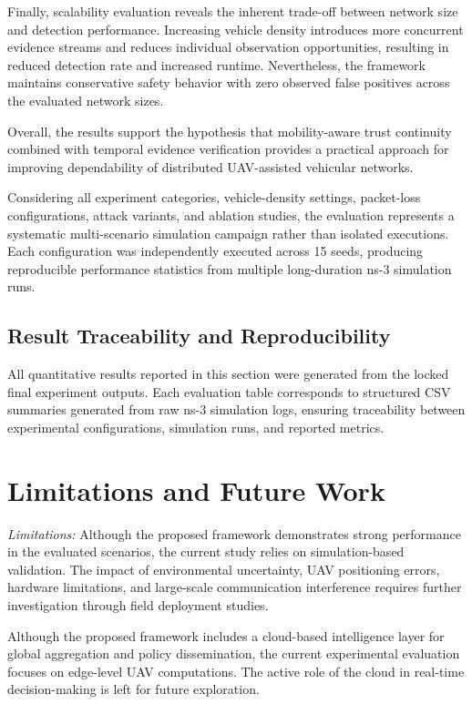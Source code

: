 \documentclass[journal]{IEEEtran}
\begin{document}
Finally, scalability evaluation reveals the inherent trade-off between
network size and detection performance. Increasing vehicle density introduces
more concurrent evidence streams and reduces individual observation
opportunities, resulting in reduced detection rate and increased runtime.
Nevertheless, the framework maintains conservative safety behavior with zero
observed false positives across the evaluated network sizes.

Overall, the results support the hypothesis that mobility-aware trust
continuity combined with temporal evidence verification provides a practical
approach for improving dependability of distributed UAV-assisted
vehicular networks.

Considering all experiment categories, vehicle-density settings,
packet-loss configurations, attack variants, and ablation studies,
the evaluation represents a systematic multi-scenario simulation campaign rather
than isolated executions. Each configuration was independently
executed across 15 seeds, producing reproducible performance
statistics from multiple long-duration ns-3 simulation runs.

\subsection{Result Traceability and Reproducibility}

All quantitative results reported in this section were generated from
the locked final experiment outputs. Each evaluation table corresponds
to structured CSV summaries generated from raw ns-3 simulation logs,
ensuring traceability between experimental configurations, simulation
runs, and reported metrics.

\section{Limitations and Future Work}
\label{sec:limitations_future_work}

\textit{Limitations:}
Although the proposed framework demonstrates strong performance in the
evaluated scenarios, the current study relies on simulation-based validation.
The impact of environmental uncertainty, UAV positioning errors, hardware
limitations, and large-scale communication interference requires further
investigation through field deployment studies.

Although the proposed framework includes a cloud-based intelligence layer for
global aggregation and policy dissemination, the current experimental
evaluation focuses on edge-level UAV computations. The active role of the
cloud in real-time decision-making is left for future exploration.
\end{document}
